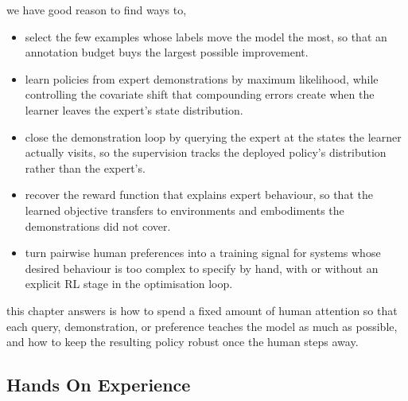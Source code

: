 we have good reason to find ways to,
\begin{itemize}
    \item select the few examples whose labels move the model the most,
    so that an annotation budget buys the largest possible improvement.
    \item learn policies from expert demonstrations by maximum likelihood,
    while controlling the covariate shift that compounding errors create when the learner leaves the expert's state distribution.
    \item close the demonstration loop by querying the expert at the states the learner actually visits,
    so the supervision tracks the deployed policy's distribution rather than the expert's.
    \item recover the reward function that explains expert behaviour,
    so that the learned objective transfers to environments and embodiments the demonstrations did not cover.
    \item turn pairwise human preferences into a training signal for systems
    whose desired behaviour is too complex to specify by hand,
    with or without an explicit RL stage in the optimisation loop.
\end{itemize}

 this chapter answers is how to spend a fixed amount of human attention
so that each query, demonstration, or preference teaches the model as much as possible,
and how to keep the resulting policy robust once the human steps away.

\newpage

\iffalse
\subsection{Hands On Experience}

